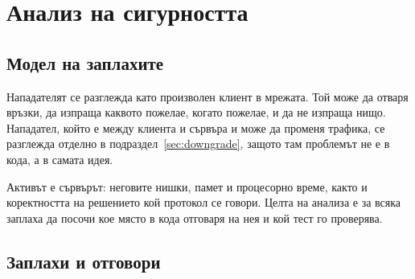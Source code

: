 \section{Анализ на сигурността}
\label{sec:security}

\subsection{Модел на заплахите}

Нападателят се разглежда като произволен клиент в мрежата. Той може да отваря връзки,
да изпраща каквото пожелае, когато пожелае, и да не изпраща нищо. Нападател, който е
между клиента и сървъра и може да променя трафика, се разглежда отделно в
подраздел~\ref{sec:downgrade}, защото там проблемът не е в кода, а в самата идея.

Активът е сървърът: неговите нишки, памет и процесорно време, както и коректността на
решението кой протокол се говори. Целта на анализа е за всяка заплаха да посочи кое
място в кода отговаря на нея и кой тест го проверява.

\subsection{Заплахи и отговори}

